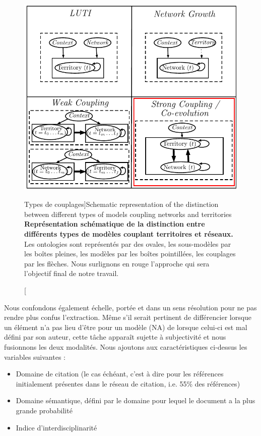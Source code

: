 \begin{figure}[h!]
\includegraphics[width=\linewidth]{Figures/Modelography/coevolution}
\caption[Coupling types][Types de couplages]{Schematic representation of the distinction between different types of models coupling networks and territories \label{fig:modelography:coevolution}}{\textbf{Représentation schématique de la distinction entre différents types de modèles couplant territoires et réseaux.} Les ontologies sont représentés par des ovales, les sous-modèles par les boîtes pleines, les modèles par les boîtes pointillées, les couplages par les flèches. Nous surlignons en rouge l'approche qui sera l'objectif final de notre travail.\label{fig:modelography:coevolution}}
\end{figure}

Nous confondons également échelle, portée et dans un sens résolution pour ne pas rendre plus confus l'extraction. Même s'il serait pertinent de différencier lorsque un élément n'a pas lieu d'être pour un modèle (NA) de lorsque celui-ci est mal défini par son auteur, cette tâche apparaît sujette à subjectivité et nous fusionnons les deux modalités. Nous ajoutons aux caractéristiques ci-dessus les variables suivantes :

\begin{itemize}
\item Domaine de citation (le cas échéant, c'est à dire pour les références initialement présentes dans le réseau de citation, i.e. 55\% des références)
\item Domaine sémantique, défini par le domaine pour lequel le document a la plus grande probabilité
\item Indice d'interdisciplinarité
\end{itemize}

